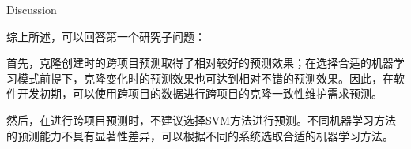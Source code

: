 
{Discussion}

综上所述，可以回答第一个研究子问题：

首先，克隆创建时的跨项目预测取得了相对较好的预测效果；在选择合适的机器学习模式前提下，克隆变化时的预测效果也可达到相对不错的预测效果。因此，在软件开发初期，可以使用跨项目的数据进行跨项目的克隆一致性维护需求预测。

然后，在进行跨项目预测时，不建议选择SVM方法进行预测。不同机器学习方法的预测能力不具有显著性差异，可以根据不同的系统选取合适的机器学习方法。


